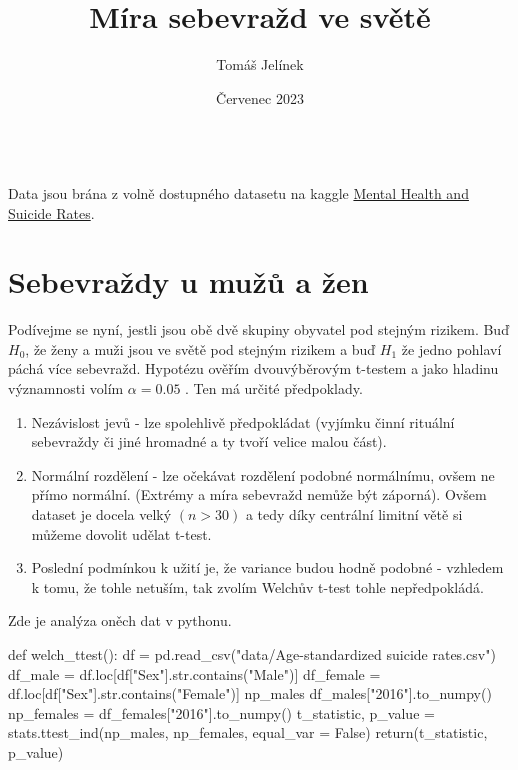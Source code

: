 \documentclass[12pt]{article}
\title{Míra sebevražd ve světě}
\author{Tomáš Jelínek}
\date{Červenec 2023}
\begin{document}
\maketitle
{}\\

Data jsou brána z volně dostupného datasetu na kaggle \href{https://www.kaggle.com/datasets/twinkle0705/mental-health-and-suicide-rates?select=Facilities.csv}{Mental Health and Suicide Rates}.  

\section{Sebevraždy u mužů a žen}
Podívejme se nyní, jestli jsou obě dvě skupiny obyvatel pod stejným rizikem. Buď $H_0$, že ženy a muži jsou ve světě pod stejným rizikem a buď $H_1$ že jedno pohlaví páchá více sebevražd. Hypotézu ověřím dvouvýběrovým t-testem a jako hladinu významnosti volím $\alpha = 0.05$ . Ten má určité předpoklady.
\begin{enumerate}
\item Nezávislost jevů - lze spolehlivě předpokládat (vyjímku činní rituální sebevraždy či jiné hromadné a ty tvoří velice malou část).
\item Normální rozdělení - lze očekávat rozdělení podobné normálnímu, ovšem ne přímo normální. (Extrémy a míra sebevražd nemůže být záporná). Ovšem dataset je docela velký $(n > 30)$ a tedy díky centrální limitní větě si můžeme dovolit udělat t-test.
\item Poslední podmínkou k užití je, že variance budou hodně podobné - vzhledem k tomu, že tohle netuším, tak zvolím Welchův t-test tohle nepředpokládá.
\end{enumerate}

\newpage
Zde je analýza oněch dat v pythonu.
\begin{python}
def welch_ttest():
	df = pd.read_csv("data/Age-standardized suicide rates.csv")
    df_male = df.loc[df["Sex"].str.contains("Male")]
    df_female = df.loc[df["Sex"].str.contains("Female")]
    np_males df_males["2016"].to_numpy()
    np_females = df_females["2016"].to_numpy()
    t_statistic, p_value = stats.ttest_ind(np_males, np_females, equal_var = False)
    return(t_statistic, p_value)
\end{python}
\end{document}
